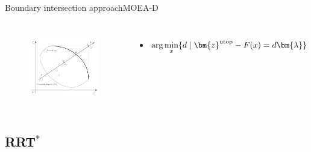 \begin{frame}{Boundary intersection approach}{MOEA-D}
	\begin{columns}
		\begin{figure}
			\centering
			\includegraphics[width=\linewidth]{figure/boundary_intersection}
			\label{fig:boundary_intersection}
		\end{figure}
		\begin{minipage}{\textwidth}
			\begin{itemize}[leftmargin=*]
				\item \begin{equation}
				\nonumber
				\arg\min_x \{ d \mid \bm{z}^{\rm utop} - F(x) = d \bm{\lambda} \}
				\end{equation}
			\end{itemize}
		\end{minipage}
	\end{columns}
\end{frame}

\subsection{RRT$^{*}$}

